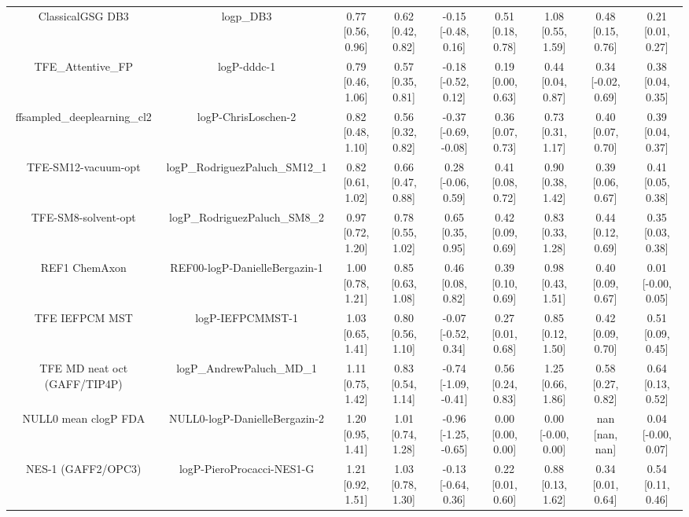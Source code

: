 \documentclass{article}
\begin{document}
\begin{center}
\begin{longtable}{|ccccccccc|}
             ClassicalGSG DB3 &                                      logp\_DB3 &  0.77 [0.56, 0.96] &  0.62 [0.42, 0.82] &   -0.15 [-0.48, 0.16] &  0.51 [0.18, 0.78] &     1.08 [0.55, 1.59] &     0.48 [0.15, 0.76] &     0.21 [0.01, 0.27] \\
             TFE_Attentive_FP &                                    logP-dddc-1 &  0.79 [0.46, 1.06] &  0.57 [0.35, 0.81] &   -0.18 [-0.52, 0.12] &  0.19 [0.00, 0.63] &     0.44 [0.04, 0.87] &    0.34 [-0.02, 0.69] &     0.38 [0.04, 0.35] \\
   ffsampled_deeplearning_cl2 &                            logP-ChrisLoschen-2 &  0.82 [0.48, 1.10] &  0.56 [0.32, 0.82] &  -0.37 [-0.69, -0.08] &  0.36 [0.07, 0.73] &     0.73 [0.31, 1.17] &     0.40 [0.07, 0.70] &     0.39 [0.04, 0.37] \\
          TFE-SM12-vacuum-opt &                 logP\_RodriguezPaluch\_SM12\_1 &  0.82 [0.61, 1.02] &  0.66 [0.47, 0.88] &    0.28 [-0.06, 0.59] &  0.41 [0.08, 0.72] &     0.90 [0.38, 1.42] &     0.39 [0.06, 0.67] &     0.41 [0.05, 0.38] \\
          TFE-SM8-solvent-opt &                  logP\_RodriguezPaluch\_SM8\_2 &  0.97 [0.72, 1.20] &  0.78 [0.55, 1.02] &     0.65 [0.35, 0.95] &  0.42 [0.09, 0.69] &     0.83 [0.33, 1.28] &     0.44 [0.12, 0.69] &     0.35 [0.03, 0.38] \\
                REF1 ChemAxon &                  REF00-logP-DanielleBergazin-1 &  1.00 [0.78, 1.21] &  0.85 [0.63, 1.08] &     0.46 [0.08, 0.82] &  0.39 [0.10, 0.69] &     0.98 [0.43, 1.51] &     0.40 [0.09, 0.67] &    0.01 [-0.00, 0.05] \\
               TFE IEFPCM MST &                               logP-IEFPCMMST-1 &  1.03 [0.65, 1.41] &  0.80 [0.56, 1.10] &   -0.07 [-0.52, 0.34] &  0.27 [0.01, 0.68] &     0.85 [0.12, 1.50] &     0.42 [0.09, 0.70] &     0.51 [0.09, 0.45] \\
 TFE MD neat oct (GAFF/TIP4P) &                      logP\_AndrewPaluch\_MD\_1 &  1.11 [0.75, 1.42] &  0.83 [0.54, 1.14] &  -0.74 [-1.09, -0.41] &  0.56 [0.24, 0.83] &     1.25 [0.66, 1.86] &     0.58 [0.27, 0.82] &     0.64 [0.13, 0.52] \\
         NULL0 mean clogP FDA &                  NULL0-logP-DanielleBergazin-2 &  1.20 [0.95, 1.41] &  1.01 [0.74, 1.28] &  -0.96 [-1.25, -0.65] &  0.00 [0.00, 0.00] &    0.00 [-0.00, 0.00] &        nan [nan, nan] &    0.04 [-0.00, 0.07] \\
           NES-1 (GAFF2/OPC3) &                      logP-PieroProcacci-NES1-G &  1.21 [0.92, 1.51] &  1.03 [0.78, 1.30] &   -0.13 [-0.64, 0.36] &  0.22 [0.01, 0.60] &     0.88 [0.13, 1.62] &     0.34 [0.01, 0.64] &     0.54 [0.11, 0.46] \\

\end{longtable}
\end{center}
\end{document}

